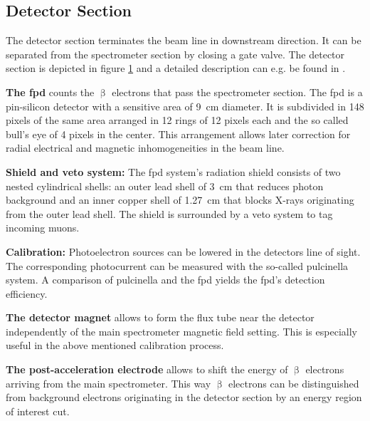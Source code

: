    \subsection{Detector Section}
    \label{sec:detector}
    \begin{figure}[t]
	    \label{fig:detector}
    \end{figure}
    
    The detector section terminates the beam line in downstream direction. It can be separated from the spectrometer section by closing a gate valve. The detector section is depicted in figure \ref{fig:detector} and a detailed description can e.g. be found in \cite{Amsbaugh2015}.
    
    {\par \textbf{The \gls{fpd}} counts the $\upbeta$ electrons that pass the spectrometer section. The \gls{fpd} is a pin-silicon detector with a sensitive area of \SI{9}{cm} diameter. It is subdivided in 148 pixels of the same area arranged in 12 rings of 12 pixels each and the so called bull's eye of 4 pixels in the center. This arrangement allows later correction for radial electrical and magnetic inhomogeneities in the beam line.}
    
    {\par \textbf{Shield and veto system:} The \gls{fpd} system's radiation shield consists of two nested cylindrical shells: an outer lead shell of \SI{3}{cm} that reduces photon background and an inner copper shell of \SI{1.27}{cm} that blocks X-rays originating from the outer lead shell. The shield is surrounded by a veto system to tag incoming muons.}
    
    {\par \textbf{Calibration:} Photoelectron sources can be lowered in the detectors line of sight. The corresponding photocurrent can be measured with the so-called \gls{pulcinella} system. A comparison of \gls{pulcinella} and the \gls{fpd} yields the \gls{fpd}'s detection efficiency.}
    
    {\par \textbf{The detector magnet} allows to form the flux tube near the detector independently of the main spectrometer magnetic field setting. This is especially useful in the above mentioned calibration process.}
    
    {\par \textbf{The post-acceleration electrode} allows to shift the energy of $\upbeta$ electrons arriving from the main spectrometer. This way $\upbeta$ electrons can be distinguished from background electrons originating in the detector section by an energy region of interest cut.}
    
   